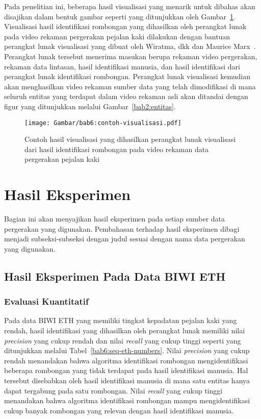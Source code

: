 Pada penelitian ini, beberapa hasil visualisasi yang menarik untuk dibahas akan disajikan dalam bentuk gambar seperti yang ditunjukkan oleh Gambar~\ref{bab6:contoh-visualisasi}. Visualisasi hasil identifikasi rombongan yang dihasilkan oleh perangkat lunak pada video rekaman pergerakan pejalan kaki dilakukan dengan bantuan perangkat lunak visualisasi yang dibuat oleh Wiratma, dkk dan Maurice Marx~\cite{wiratma:software}. Perangkat lunak tersebut menerima masukan berupa rekaman video pergerakan, rekaman data lintasan, hasil identifikasi manusia, dan hasil identifikasi dari perangkat lunak identifikasi rombongan. Perangkat lunak visualisasi kemudian akan menghasilkan video rekaman sumber data yang telah dimodifikasi di mana seluruh entitas yang terdapat dalam video rekaman asli akan ditandai dengan figur yang ditunjukkan melalui Gambar~\ref{bab2:entitas}.

\begin{figure}[h!]
    \centering
    \captionsetup{width=0.85\textwidth}
    \texttt{[image: Gambar/bab6:contoh-visualisasi.pdf]}
    \caption[Contoh hasil visualisasi rombongan]{Contoh hasil visualisasi yang dihasilkan perangkat lunak visualisasi dari hasil identifikasi rombongan pada video rekaman data pergerakan pejalan kaki}
    \label{bab6:contoh-visualisasi}
\end{figure}

\section{Hasil Eksperimen}
\label{sec:result}

Bagian ini akan menyajikan hasil eksperimen pada setiap sumber data pergerakan yang digunakan. Pembahasan terhadap hasil eksperimen dibagi menjadi subseksi-subseksi dengan judul sesuai dengan nama data pergerakan yang digunakan.

\subsection{Hasil Eksperimen Pada Data BIWI ETH}
\label{subsec:eth-result}

\subsubsection{Evaluasi Kuantitatif}
\label{subsubsec:eth-quantitative}

Pada data BIWI ETH yang memiliki tingkat kepadatan pejalan kaki yang rendah, hasil identifikasi yang dihasilkan oleh perangkat lunak memiliki nilai \textit{precision} yang cukup rendah dan nilai \textit{recall} yang cukup tinggi seperti yang ditunjukkan melalui Tabel~\ref{bab6:seq-eth-numbers}. Nilai \textit{precision} yang cukup rendah menandakan bahwa algoritma identifikasi rombongan mengidentifikasi beberapa rombongan yang tidak terdapat pada hasil identifikasi manusia. Hal tersebut disebabkan oleh hasil identifikasi manusia di mana satu entitas hanya dapat tergabung pada satu rombongan. Nilai \textit{recall} yang cukup tinggi menandakan bahwa algoritma identifikasi rombongan mampu
mengidentifikasi cukup banyak rombongan yang relevan dengan hasil identifikasi manusia.

